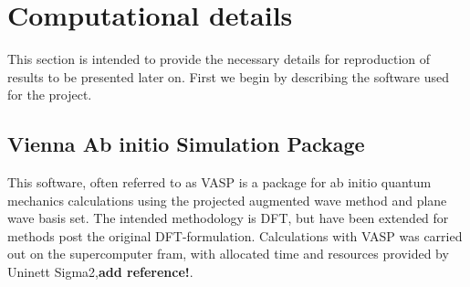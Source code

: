 \chapter{Computational details}
\label{sec:Computation}

This section is intended to provide the necessary details for reproduction of results to be presented later on. First we begin by describing the software used for the project. 

\section{Vienna Ab initio Simulation Package}
This software, often referred to as VASP is a package for ab initio quantum mechanics calculations using the projected augmented wave method and plane wave basis set. The intended methodology is DFT, but have been extended for methods post the original DFT-formulation. Calculations with VASP was carried out on the supercomputer fram, with allocated time and resources provided by Uninett Sigma2,\textbf{add reference!}.

